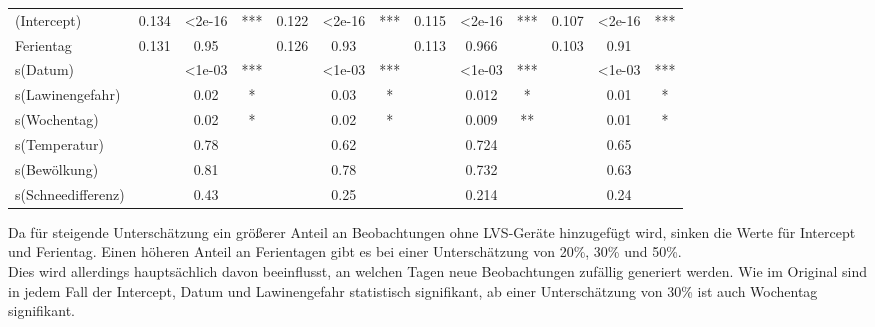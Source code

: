 \documentclass[12pt]{scrreprt}
\begin{document}
\begin{table}[htbp]
\begin{adjustbox}{max width=\textwidth}
\begin{tabular}{l|ccc|ccc|ccc|ccc|}
		\cmidrule{2-13}    (Intercept) & 0.134 & <2e-16 & ***   & 0.122 & <2e-16 & ***   & 0.115 & <2e-16 & ***   & 0.107 & <2e-16 & *** \\
		Ferientag & 0.131 & 0.95  &       & 0.126 & 0.93  &       & 0.113 & 0.966 &       & 0.103 & 0.91  &   \\
		s(Datum) &       & <1e-03 & ***   &       & <1e-03 & ***   &       & <1e-03 & ***   &       & <1e-03 & *** \\
		s(Lawinengefahr) &       & 0.02  & *     &       & 0.03  & *     &       & 0.012 & *     &       & 0.01  & * \\
		s(Wochentag) &       & 0.02  & *     &       & 0.02  & *     &       & 0.009 & **    &       & 0.01  & * \\
		s(Temperatur) &       & 0.78  &       &       & 0.62  &       &       & 0.724 &       &       & 0.65  &   \\
		s(Bewölkung) &       & 0.81  &       &       & 0.78  &       &       & 0.732 &       &       & 0.63  &   \\
		s(Schneedifferenz) &       & 0.43  &       &       & 0.25  &       &       & 0.214 &       &       & 0.24  &   \\
		\cmidrule{2-13}    
	\end{tabular}%
	\end{adjustbox}
	\label{tab:Szenario 1 im Tagesmodell}%
\end{table}%
\noindent Da für steigende Unterschätzung ein größerer Anteil an Beobachtungen ohne LVS-Geräte hinzugefügt wird, sinken die Werte für Intercept und Ferientag. Einen höheren Anteil an Ferientagen gibt es bei einer Unterschätzung von 20\%, 30\% und 50\%. \\
Dies wird allerdings hauptsächlich davon beeinflusst, an welchen Tagen neue Beobachtungen zufällig generiert werden. Wie im Original sind in jedem Fall der Intercept, Datum und Lawinengefahr statistisch signifikant, ab einer Unterschätzung von 30\% ist auch Wochentag signifikant.\\
\end{document}

